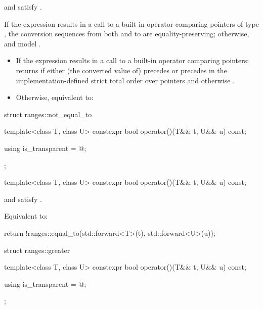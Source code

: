 \begin{itemdescr}
\pnum
\constraints
{} and  satisfy .

\pnum
\expects
If the expression 
results in a call to a built-in operator \tcode{==} comparing pointers of type
, the conversion sequences from both  and  to 
are equality-preserving;
otherwise,  and  model .

\pnum
\effects
\begin{itemize}
\item
  If the expression  results in
  a call to a built-in operator \tcode{==} comparing pointers:
  returns  if either (the converted value of)  precedes
   or  precedes  in the implementation-defined strict
  total order over pointers and otherwise .

\item
  Otherwise, equivalent to:
\end{itemize}
\end{itemdescr}

%
\begin{codeblock}
struct ranges::not_equal_to {
  template<class T, class U>
    constexpr bool operator()(T&& t, U&& u) const;

  using is_transparent = @\unspecnc@;
};
\end{codeblock}

\begin{itemdecl}
template<class T, class U>
  constexpr bool operator()(T&& t, U&& u) const;
\end{itemdecl}

\begin{itemdescr}
\pnum
\constraints
{} and  satisfy .

\pnum
\effects
Equivalent to:
\begin{codeblock}
return !ranges::equal_to{}(std::forward<T>(t), std::forward<U>(u));
\end{codeblock}
\end{itemdescr}

%
\begin{codeblock}
struct ranges::greater {
  template<class T, class U>
  constexpr bool operator()(T&& t, U&& u) const;

  using is_transparent = @\unspecnc@;
};
\end{codeblock}

